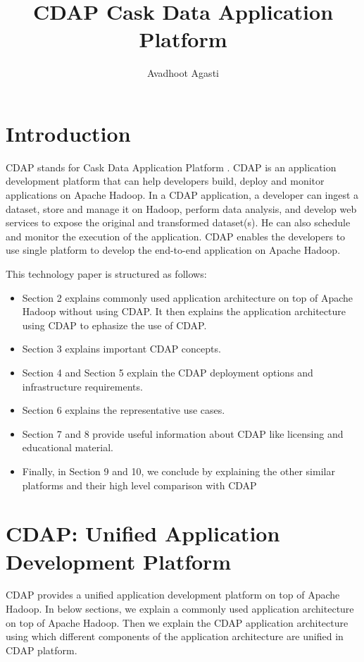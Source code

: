 \documentclass[9pt,twocolumn,twoside]{styles/osajnl}
\title{CDAP Cask Data Application Platform}
\author[1,*, +]{Avadhoot Agasti}
\affil[1]{School of Informatics and Computing, Bloomington, IN 47408, U.S.A.}
\affil[*]{Corresponding authors: aagasti@indiana.edu}
\affil[+]{HID - SL-IO-3000}
\begin{document}
\maketitle

\section{Introduction}

CDAP stands for Cask Data Application Platform \cite{www-cask-io}. CDAP is an
application development platform that can help developers build, deploy and
 monitor applications on Apache Hadoop. In a CDAP application, a
 developer can ingest a dataset, store and manage it on Hadoop, perform
 data analysis, and develop web services to expose the original and
 transformed dataset(s). He can also schedule and monitor the execution of
 the application. CDAP enables the developers to use single platform to
 develop the end-to-end application on Apache Hadoop.

This technology paper is structured as follows:
\begin{itemize}
\item Section 2 explains commonly used application architecture on top of
Apache Hadoop without using CDAP. It then explains the application
architecture using CDAP to ephasize the use of CDAP.
\item Section 3 explains important CDAP concepts.
\item Section 4 and Section 5 explain the CDAP deployment options and
infrastructure requirements.
\item Section 6 explains the representative use cases.
\item Section 7 and 8 provide useful information about CDAP like licensing
and educational material.
\item Finally, in Section 9 and 10, we conclude by explaining the other similar
platforms and their high level comparison with CDAP
\end{itemize}

\section{CDAP: Unified Application Development Platform}
CDAP provides a unified application development platform on top of Apache
Hadoop. In below sections, we explain a commonly used application
architecture on top of Apache Hadoop. Then we explain the CDAP application
architecture using which different components of the application architecture
 are unified in CDAP platform.
\end{document}
